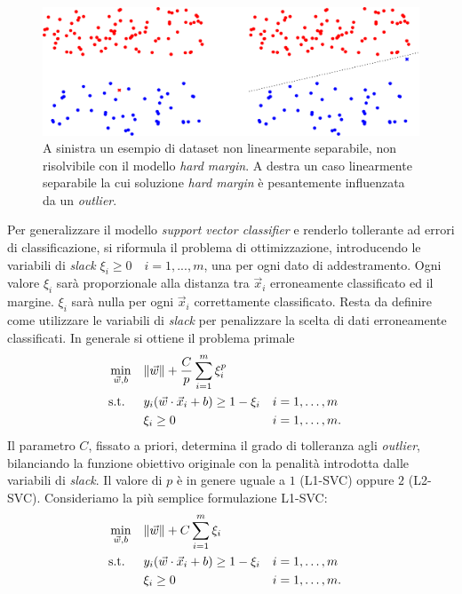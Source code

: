 \begin{figure}[ht]
    \centering
    \includegraphics[width=\linewidth]{img/casi_dove_hardmargin_va_male_o_non_va.pdf}
    \caption{A sinistra un esempio di dataset non linearmente separabile, non risolvibile con il modello \emph{hard margin}. A destra un caso linearmente separabile la cui soluzione \emph{hard margin} è pesantemente influenzata da un \emph{outlier}.}
    \label{fig:svc:softmargin:casi_che_hardmargin_non_risolve}
\end{figure}
Per generalizzare il modello \emph{support vector classifier} e renderlo tollerante ad errori di classificazione, si riformula il problema di ottimizzazione, introducendo le variabili di \emph{slack} $\xi_i \geq 0 \quad i=1,...,m$, una per ogni dato di addestramento. Ogni valore $\xi_i$ sarà proporzionale alla distanza tra $\Vec{x}_i$ erroneamente classificato ed il margine. $\xi_i$ sarà nulla per ogni $\Vec{x}_i$ correttamente classificato. Resta da definire come utilizzare le variabili di \emph{slack} per penalizzare la scelta di dati erroneamente classificati. 
In generale si ottiene il problema primale
\begin{equation}
\begin{aligned}
& \min_{\Vec{w},b}    && \|\Vec{w}\| + \frac{C}{p}\sum_{i=1}^{m}\xi_i^p\\
& \textrm{s.t.} && y_i(\Vec{w}\cdot\Vec{x}_i + b) \geq 1 - \xi_i &&  i=1,\dots,m \\
&               && \xi_i \geq 0                 &&  i=1,\dots,m.\\
\end{aligned}
\end{equation}
Il parametro $C$, fissato a priori, determina il grado di tolleranza agli \emph{outlier}, bilanciando la funzione obiettivo originale con la penalità introdotta dalle variabili di \emph{slack}.
%
Il valore di $p$ è in genere uguale a $1$ (L1-SVC) oppure $2$ (L2-SVC). Consideriamo la più semplice formulazione L1-SVC:
\begin{equation}
\label{eq:svc:softmargin:primal}
\begin{aligned}
& \min_{\Vec{w},b}    && \|\Vec{w}\| + C\sum_{i=1}^{m}\xi_i\\
& \textrm{s.t.} && y_i(\Vec{w}\cdot\Vec{x}_i + b) \geq 1 - \xi_i &&  i=1,\dots,m \\
&               && \xi_i \geq 0                 &&  i=1,\dots,m.\\
\end{aligned}
\end{equation}
